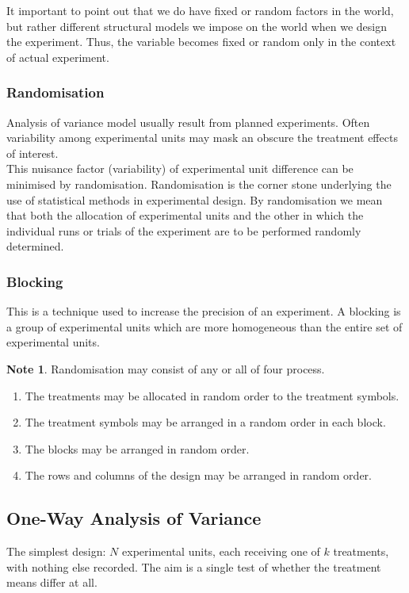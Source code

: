 \documentclass[11pt,a4paper]{article}
\theoremstyle{definition}
\newtheorem*{note}{Note}
\begin{document}
It important to point out that we do have fixed or random factors in the world, but rather different structural models we impose on the world when we design the experiment. Thus, the variable becomes fixed or random only in the context of actual experiment.

\subsubsection*{Randomisation}
Analysis of variance model usually result from planned experiments. Often variability among experimental units may mask an obscure the treatment effects of interest.\\
This nuisance factor (variability) of experimental unit difference can be minimised by randomisation. Randomisation is the corner stone underlying the use of statistical methods in experimental design. By randomisation we mean that both the allocation of experimental units  and the other in which the individual runs or trials of the experiment are to be performed randomly determined.\\

\subsubsection*{Blocking}
This is a technique used to increase the precision of an experiment. A blocking is a group of experimental units which are more homogeneous than the entire set of experimental units.

\begin{note}
Randomisation may consist of any or all of four process.
\begin{enumerate}
\item The treatments may be allocated in random order to the treatment symbols.
\item The treatment symbols may be arranged in a random order in each block.
\item The blocks may be arranged in random  order.
\item The rows and columns of the design may be arranged in random order.\\
\end{enumerate}
\end{note}


\subsection{One-Way Analysis of Variance}
The simplest design: $N$ experimental units, each receiving one of $k$
treatments, with nothing else recorded. The aim is a single test of whether the
treatment means differ at all.
\end{document}
